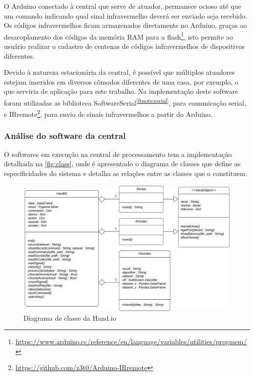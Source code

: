 O Arduino conectado à central que serve de atuador, permanece ocioso até que um comando indicando qual sinal infravermelho deverá ser enviado seja recebido. Os códigos infravermelhos ficam armazenados diretamente no Arduino, graças ao desacoplamento dos códigos da memória RAM para a flash\footnote{\url{https://www.arduino.cc/reference/en/language/variables/utilities/progmem/}}, isto permite ao usuário realizar o cadastro de centenas de códigos infravermelhos de dispositivos diferentes. 

Devido à natureza estacionária da central, é possível que múltiplos atuadores estejam inseridos em diversos cômodos diferentes de uma casa, por exemplo, o que serviria de aplicação para este trabalho. Na implementação deste software foram utilizadas as biblioteca SoftwareSerial\textsuperscript{\ref{ftnote:serial}}, para comunicação serial, e IRremote\footnote{\url{https://github.com/z3t0/Arduino-IRremote}}, para envio de sinais infravermelhos a partir do Arduino.


\subsubsection{Análise do software da central}


O softwares em execução na central de processamento tem a implementação detalhada na \autoref{fig:class}, onde é apresentado o diagrama de classes que define as especificidades do sistema e detalha as relações entre as classes que o constituem.

\begin{figure}[ht]
    \centering
    \includegraphics[width=\textwidth, keepaspectratio]{resources/diagrama_classe.pdf}
    \caption{Diagrama de classe da Hand.io}
    \label{fig:class}
\end{figure}


